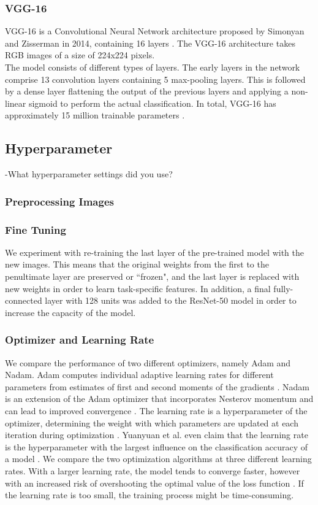 \documentclass[sn-mathphys,Numbered]{sn-jnl}%
\theoremstyle{thmstyleone}%
\theoremstyle{thmstyletwo}%
\theoremstyle{thmstylethree}%
\begin{document}
\subsubsection{VGG-16}\label{VGG-16}
VGG-16 is a Convolutional Neural Network architecture proposed by Simonyan and Zisserman in 2014, containing 16 layers \cite{Alzubaidi_2021}.
The VGG-16 architecture takes RGB images of a size of 224x224 pixels.\\
The model consists of different types of layers. The early layers in the network comprise 13 convolution layers containing 5 max-pooling layers.
This is followed by a dense layer flattening the output of the previous layers and applying a non-linear sigmoid to perform the actual classification. In total, VGG-16 has approximately 15 million trainable parameters \cite{Rahdika_2020}.

\subsection{Hyperparameter}\label{Hyperparameter}
-What hyperparameter settings did you use?
\subsubsection{Preprocessing Images}\label{Preprocessing}
\subsubsection{Fine Tuning}\label{finetuning}
We experiment with re-training the last layer of the pre-trained model with the new images. This means that the original weights from the first to the penultimate layer are preserved or ``frozen", and the last layer is replaced with new weights in order to learn task-specific features. In addition, a final fully-connected layer with 128 units was added to the ResNet-50 model in order to increase the capacity of the model.

\subsubsection{Optimizer and Learning Rate}\label{learningrate}
We compare the performance of two different optimizers, namely Adam and Nadam. Adam computes individual adaptive learning rates for different parameters from estimates of first and second moments of the gradients \cite{kingma2017adam}. Nadam is an extension of the Adam optimizer that incorporates Nesterov momentum and can lead to improved convergence \cite{dozat.2016}.
The learning rate is a hyperparameter of the optimizer, determining the weight with which parameters are updated at each iteration during optimization \cite{Brownlee_2020}.
Yuanyuan et al. even claim that the learning rate is the hyperparameter with the largest influence on the classification accuracy of a model \cite{Yuanyuan_2020}. 
We compare the two optimization algorithms at three different learning rates.
With a larger learning rate, the model tends to converge faster, however with an increased risk of overshooting the optimal value of the loss function \cite{Brownlee_2020}.
If the learning rate is too small, the training process might be time-consuming.
\end{document}
